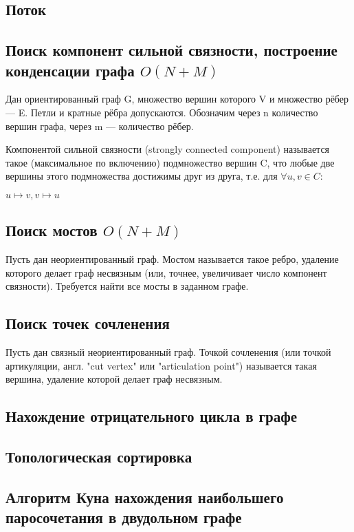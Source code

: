 \documentclass[a4paper]{article}
\begin{document}
\begin{multicols*}{2}
		\subsection{Поток}
		
		\subsection{Поиск компонент сильной связности, построение конденсации графа $O(N+M)$}
		Дан ориентированный граф G, множество вершин которого V и множество рёбер — E. Петли и кратные рёбра допускаются. Обозначим через n количество вершин графа, через m — количество рёбер.
		
		Компонентой сильной связности (strongly connected component) называется такое (максимальное по включению) подмножество вершин C, что любые две вершины этого подмножества достижимы друг из друга, т.е. для $\forall u,v \in C:$
		
		$u \mapsto v, v \mapsto u $
		
		\subsection{Поиск мостов $O(N+M)$}
		Пусть дан неориентированный граф. Мостом называется такое ребро, удаление которого делает граф несвязным (или, точнее, увеличивает число компонент связности). Требуется найти все мосты в заданном графе.		
		
		\subsection{Поиск точек сочленения}
		Пусть дан связный неориентированный граф. Точкой сочленения (или точкой артикуляции, англ. "cut vertex" или "articulation point") называется такая вершина, удаление которой делает граф несвязным.
		
		\subsection{Нахождение отрицательного цикла в графе}
		
		\subsection{Топологическая сортировка}
		
		\subsection{Алгоритм Куна нахождения наибольшего паросочетания в двудольном графе}
		

\end{multicols*}
\end{document}
